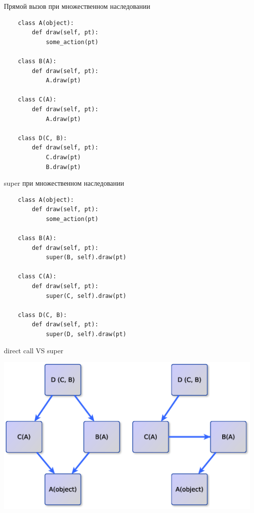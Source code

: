 \documentclass{article}
\begin{document}
\begin{center} Прямой вызов при множественном наследовании \end{center}
\begin{lstlisting}
    class A(object):
        def draw(self, pt):
            some_action(pt)

    class B(A):
        def draw(self, pt):
            A.draw(pt)

    class C(A):
        def draw(self, pt):
            A.draw(pt)

    class D(C, B):
        def draw(self, pt):
            C.draw(pt)
            B.draw(pt)
\end{lstlisting}
\newpage

\begin{center} super при множественном наследовании \end{center}
\begin{lstlisting}
    class A(object):
        def draw(self, pt):
            some_action(pt)

    class B(A):
        def draw(self, pt):
            super(B, self).draw(pt)

    class C(A):
        def draw(self, pt):
            super(C, self).draw(pt)

    class D(C, B):
        def draw(self, pt):
            super(D, self).draw(pt)
\end{lstlisting}
\newpage

\begin{center}direct call VS super\end{center}
\begin{center} \includegraphics{images/linearization_simple.eps} \end{center} 
\newpage
\end{document}
